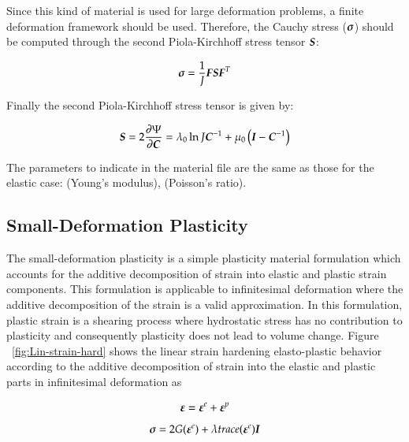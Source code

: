 Since this kind of material is used for large deformation problems, a
finite deformation framework should be used. Therefore, the Cauchy
stress ($\boldsymbol{\sigma}$) should be computed through the second
Piola-Kirchhoff stress tensor $\boldsymbol{S}$:

\begin{equation}
  \boldsymbol{\sigma } = \frac{1}{J}\boldsymbol{F}\boldsymbol{S}\boldsymbol{F}^T
\end{equation}

Finally the second Piola-Kirchhoff stress tensor is given by:

\begin{equation}
  \boldsymbol{S}  = 2\frac{\partial\Psi}{\partial\boldsymbol{C}} = \lambda_0\ln J
\boldsymbol{C}^{-1}+\mu_0\left(\boldsymbol{I}-\boldsymbol{C}^{-1}\right)
\end{equation}

The parameters to indicate in the material file are the same
as those for the elastic case:  (Young's modulus),  (Poisson's
ratio).

\subsection{Small-Deformation Plasticity}


The small-deformation plasticity is a simple plasticity material
formulation which accounts for the additive decomposition of strain
into elastic and plastic strain components. This formulation is
applicable to infinitesimal deformation where the additive
decomposition of the strain is a valid approximation. In this
formulation, plastic strain is a shearing process where hydrostatic
stress has no contribution to plasticity and consequently plasticity
does not lead to volume change. Figure ~\ref{fig:Lin-strain-hard}
shows the linear strain hardening elasto-plastic behavior according to
the additive decomposition of strain into the elastic and plastic
parts in infinitesimal deformation as


\begin{equation} \label{eqn:smm:constitutive:strain decomposition}
	\boldsymbol{\varepsilon} = \boldsymbol{\varepsilon}^e +\boldsymbol{\varepsilon}^p
\end{equation}  
\begin{equation} \label{eqn:smm:constitutive:Hooks law}
	{\ensuremath{\boldsymbol{\sigma}}} = 2G(\boldsymbol{\varepsilon}^e) + \lambda  trace(\boldsymbol{\varepsilon}^e)\boldsymbol{I}
\end{equation}

